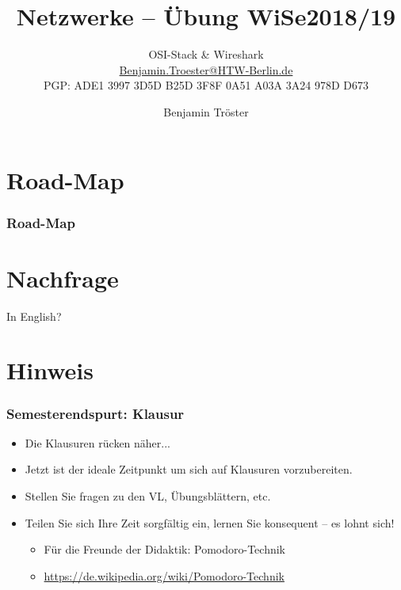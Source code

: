 \documentclass[xcolor=dvipsnames, aspectratio=169]{beamer}
\begin{document}

\title{Netzwerke -- Übung WiSe2018/19}
\subtitle{OSI-Stack \& Wireshark\\
		\href{mailto:Benjamin.Troester@HTW-Berlin.de}{Benjamin.Troester@HTW-Berlin.de}\\
		PGP: ADE1 3997 3D5D B25D 3F8F 0A51 A03A 3A24 978D D673 }
\author{Benjamin Tröster}

\date{}

\begin{frame}
\titlepage

\end{frame}

\section*{Road-Map}
\begin{frame}
\frametitle{Road-Map}
\begin{multicols}{2}
  \tableofcontents
\end{multicols}
\end{frame}

\section*{Nachfrage}
\begin{frame}{In English?}

\end{frame}

\section{Hinweis}
\begin{frame}
	\frametitle{Semesterendspurt: Klausur}
	\begin{itemize}
		\item Die Klausuren rücken näher...
		\item Jetzt ist der ideale Zeitpunkt um sich auf Klausuren vorzubereiten.
		\item Stellen Sie fragen zu den VL, Übungsblättern, etc. 
		\item Teilen Sie sich Ihre Zeit sorgfältig ein, lernen Sie konsequent -- es lohnt sich!
		\begin{itemize}
			\item Für die Freunde der Didaktik: Pomodoro-Technik
			\item \url{https://de.wikipedia.org/wiki/Pomodoro-Technik}
		\end{itemize}
	\end{itemize}
\end{frame}
\end{document}
